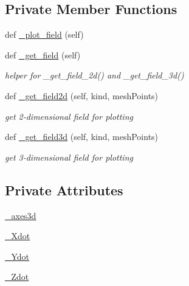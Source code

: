 \subsection*{Private Member Functions}
\begin{DoxyCompactItemize}
\item 
def \hyperlink{class_mu_mo_t_1_1_mu_mo_tfield_view_a50d59419298116f738a98c864afb9d89}{\+\_\+plot\+\_\+field} (self)
\item 
def \hyperlink{class_mu_mo_t_1_1_mu_mo_tfield_view_aefbf0e354438e17ab6d48e2d368f8540}{\+\_\+get\+\_\+field} (self)
\begin{DoxyCompactList}\small\item\em helper for \+\_\+get\+\_\+field\+\_\+2d() and \+\_\+get\+\_\+field\+\_\+3d() \end{DoxyCompactList}\item 
def \hyperlink{class_mu_mo_t_1_1_mu_mo_tfield_view_a854f5f5badcda687eff8a999e6700cb7}{\+\_\+get\+\_\+field2d} (self, kind, mesh\+Points)
\begin{DoxyCompactList}\small\item\em get 2-\/dimensional field for plotting \end{DoxyCompactList}\item 
def \hyperlink{class_mu_mo_t_1_1_mu_mo_tfield_view_a7e92a660924e058d070dd1799c27f126}{\+\_\+get\+\_\+field3d} (self, kind, mesh\+Points)
\begin{DoxyCompactList}\small\item\em get 3-\/dimensional field for plotting \end{DoxyCompactList}\end{DoxyCompactItemize}
\subsection*{Private Attributes}
\begin{DoxyCompactItemize}
\item 
\hyperlink{class_mu_mo_t_1_1_mu_mo_tfield_view_a506ccaeadc9c6f4102cf4e06f5a6be2a}{\+\_\+axes3d}
\item 
\hyperlink{class_mu_mo_t_1_1_mu_mo_tfield_view_a0f5fba57766067c941f5a96b22545ed4}{\+\_\+\+Xdot}
\item 
\hyperlink{class_mu_mo_t_1_1_mu_mo_tfield_view_a31f5ad9d4a349b00e06772177200c217}{\+\_\+\+Ydot}
\item 
\hyperlink{class_mu_mo_t_1_1_mu_mo_tfield_view_a4008c2e6651cb1bf1c9c1af3e962a25d}{\+\_\+\+Zdot}
\end{DoxyCompactItemize}

